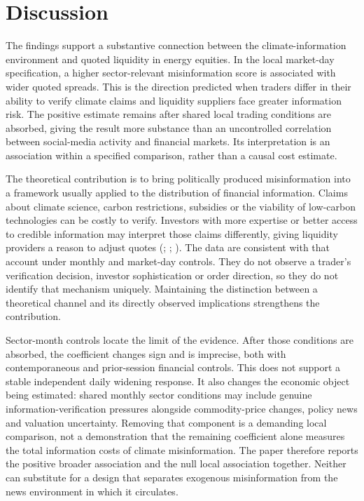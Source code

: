 \documentclass{article}
\theoremstyle{plain}
\begin{document}
\section{Discussion}
\label{sec:discussion}

The findings support a substantive connection between the climate-information environment and quoted liquidity in energy equities. In the local market-day specification, a higher sector-relevant misinformation score is associated with wider quoted spreads. This is the direction predicted when traders differ in their ability to verify climate claims and liquidity suppliers face greater information risk. The positive estimate remains after shared local trading conditions are absorbed, giving the result more substance than an uncontrolled correlation between social-media activity and financial markets. Its interpretation is an association within a specified comparison, rather than a causal cost estimate.

The theoretical contribution is to bring politically produced misinformation into a framework usually applied to the distribution of financial information. Claims about climate science, carbon restrictions, subsidies or the viability of low-carbon technologies can be costly to verify. Investors with more expertise or better access to credible information may interpret those claims differently, giving liquidity providers a reason to adjust quotes (\cite{GlostenMilgrom1985}; \cite{GrossmanStiglitz1980}; \cite{GoldsteinYang2017}). The data are consistent with that account under monthly and market-day controls. They do not observe a trader's verification decision, investor sophistication or order direction, so they do not identify that mechanism uniquely. Maintaining the distinction between a theoretical channel and its directly observed implications strengthens the contribution.

Sector-month controls locate the limit of the evidence. After those conditions are absorbed, the coefficient changes sign and is imprecise, both with contemporaneous and prior-session financial controls. This does not support a stable independent daily widening response. It also changes the economic object being estimated: shared monthly sector conditions may include genuine information-verification pressures alongside commodity-price changes, policy news and valuation uncertainty. Removing that component is a demanding local comparison, not a demonstration that the remaining coefficient alone measures the total information costs of climate misinformation. The paper therefore reports the positive broader association and the null local association together. Neither can substitute for a design that separates exogenous misinformation from the news environment in which it circulates.
\end{document}
